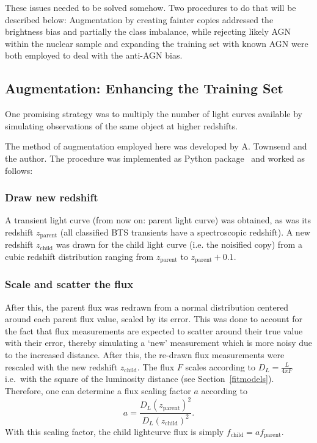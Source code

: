 These issues needed to be solved somehow. Two procedures to do that will be described below: Augmentation by creating fainter copies addressed the brightness bias and partially the class imbalance, while rejecting likely AGN within the nuclear sample and expanding the training set with known AGN were both employed to deal with the anti-AGN bias.

\subsection{Augmentation: Enhancing the Training Set}\label{noisification}
One promising strategy was to multiply the number of light curves available by simulating observations of the same object at higher redshifts.

The method of augmentation employed here was developed by A. Townsend and the author. The procedure was implemented as Python package~ and worked as follows:

\subsubsection{Draw new redshift}
A transient light curve (from now on: parent light curve) was obtained, as was its redshift $z_\text{parent}$ (all classified BTS transients have a spectroscopic redshift). A new redshift $z_\text{child}$ was drawn for the child light curve (i.e. the noisified copy) from a cubic redshift distribution ranging from $z­_\text{parent}$ to $z_\text{parent}+0.1$.

\subsubsection{Scale and scatter the flux}
After this, the parent flux was redrawn from a normal distribution centered around each parent flux value, scaled by its error. This was done to account for the fact that flux measurements are expected to scatter around their true value with their error, thereby simulating a `new' measurement which is more noisy due to the increased distance. After this, the re-drawn flux measurements were rescaled with the new redshift $z_\text{child}$. The flux $F$ scales according to $D_L=\frac{L}{4 \pi F}$ i.e.~with the square of the luminosity distance (see Section~\ref{fitmodels}). Therefore, one can determine a flux scaling factor $a$ according to
\begin{equation}
  a = \frac{D_L(z_\text{parent})^2}{D_L(z_\text{child})^2}.
\end{equation}
With this scaling factor, the child lightcurve flux is simply $f_\text{child} = a f_\text{parent}$.

